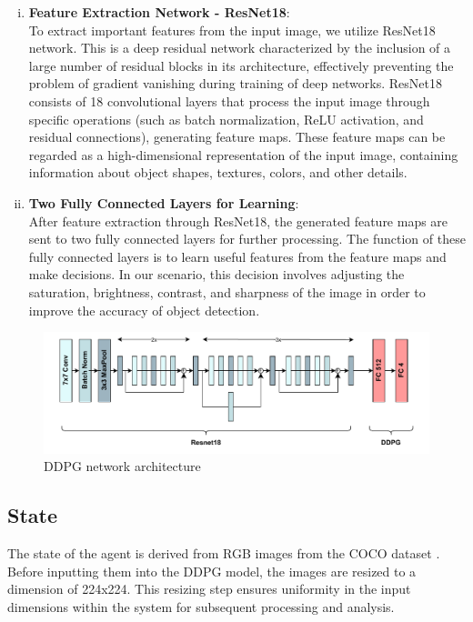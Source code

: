 \documentclass[PhD]{PHlab-thesis}
\begin{document}
\begin{enumerate}[(i)]
\item \textbf{Feature Extraction Network - ResNet18}: \\
To extract important features from the input image, we utilize ResNet18 network. This is a deep residual network characterized by the inclusion of a large number of residual blocks in its architecture, effectively preventing the problem of gradient vanishing during training of deep networks. ResNet18 consists of 18 convolutional layers that process the input image through specific operations (such as batch normalization, ReLU activation, and residual connections), generating feature maps. These feature maps can be regarded as a high-dimensional representation of the input image, containing information about object shapes, textures, colors, and other details.

\item \textbf{Two Fully Connected Layers for Learning}: \\
After feature extraction through ResNet18, the generated feature maps are sent to two fully connected layers for further processing. The function of these fully connected layers is to learn useful features from the feature maps and make decisions. In our scenario, this decision involves adjusting the saturation, brightness, contrast, and sharpness of the image in order to improve the accuracy of object detection.
\end{enumerate}

\begin{figure}[H] 
    \centering 
    \includegraphics[width=\textwidth]{images/DDPG network architecture.pdf} 
    \caption{DDPG network architecture} 
    \label{Fig.DDPG network architecture} 
\end{figure}

\subsection{State}
The state of the agent is derived from RGB images from the COCO dataset \cite{lin2014microsoft}. Before inputting them into the DDPG model, the images are resized to a dimension of 224x224. This resizing step ensures uniformity in the input dimensions within the system for subsequent processing and analysis.
\end{document}
